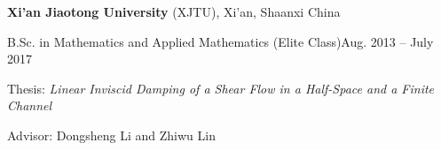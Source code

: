 \documentclass[margin,line]{res}
\newenvironment{list1}{
  \begin{list}{\ding{113}}{%
      \setlength{\itemsep}{0in}
      \setlength{\parsep}{0in} \setlength{\parskip}{0in}
      \setlength{\topsep}{0in} \setlength{\partopsep}{0in} 
      \setlength{\leftmargin}{0.17in}}}{\end{list}}
\begin{document}
\begin{resume}
{\bf Xi'an Jiaotong University} (XJTU), Xi'an, Shaanxi China\\
\vspace*{-.1in}
\begin{list1}
\item[] B.Sc. in Mathematics and Applied Mathematics (Elite Class)\hfill Aug. 2013 -- July 2017
\item[] Thesis: \textit{Linear Inviscid Damping of a Shear Flow in a Half-Space and a Finite Channel}
\item[] Advisor: Dongsheng Li and Zhiwu Lin
\end{list1}






\end{resume}
\end{document}
